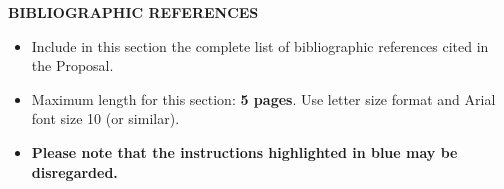 \documentclass[demo, MAIN.tex]{subfiles}
\begin{document}
\noindent\textbf{BIBLIOGRAPHIC REFERENCES}

\medskip

\begin{tcolorbox}[instructions]
  \color{fondecytblue}
  \begin{itemize}[dashitem]
  \item Include in this section the complete list of bibliographic references cited in the Proposal.
  \item Maximum length for this section: \textbf{5 pages}. Use letter size format and Arial font size 10 (or similar).
  \item \textbf{Please note that the instructions highlighted in blue may be disregarded.}
  \end{itemize}
\end{tcolorbox}

\ifSubfilesClassLoaded{%
  
}{%
  
}
\end{document}

